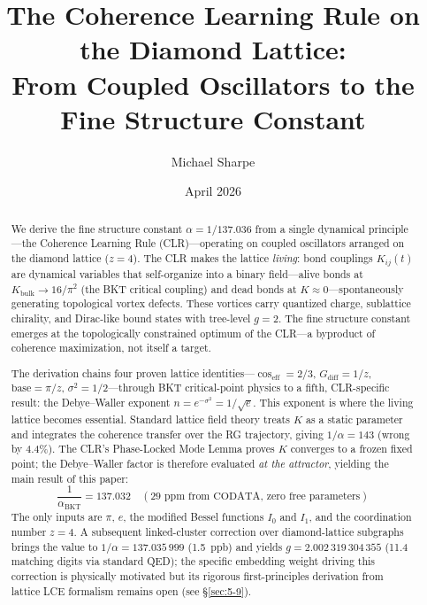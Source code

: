 \documentclass[aps,prd,onecolumn,superscriptaddress,floatfix,12pt]{revtex4-2}
\newcommand{\Kbulk}{K_{\text{bulk}}}
\newcommand{\coseff}{\cos_{\text{eff}}}
\newcommand{\Gdiff}{G_{\text{diff}}}
\begin{document}
\title{The Coherence Learning Rule on the Diamond Lattice:\\
From Coupled Oscillators to the Fine Structure Constant}

\author{Michael Sharpe}

\date{April 2026}

\begin{abstract}
We derive the fine structure constant $\alpha = 1/137.036$ from a single dynamical principle---the Coherence Learning Rule (CLR)---operating on coupled oscillators arranged on the diamond lattice ($z = 4$). The CLR makes the lattice \emph{living}: bond couplings $K_{ij}(t)$ are dynamical variables that self-organize into a binary field---alive bonds at $\Kbulk \to 16/\pi^2$ (the BKT critical coupling) and dead bonds at $K \approx 0$---spontaneously generating topological vortex defects. These vortices carry quantized charge, sublattice chirality, and Dirac-like bound states with tree-level $g = 2$. The fine structure constant emerges at the topologically constrained optimum of the CLR---a byproduct of coherence maximization, not itself a target.

The derivation chains four proven lattice identities---$\coseff = 2/3$, $\Gdiff = 1/z$, $\text{base} = \pi/z$, $\sigma^2 = 1/2$---through BKT critical-point physics to a fifth, CLR-specific result: the Debye--Waller exponent $n = e^{-\sigma^2} = 1/\sqrt{e}$.  This exponent is where the living lattice becomes essential.  Standard lattice field theory treats $K$ as a static parameter and integrates the coherence transfer over the RG trajectory, giving $1/\alpha = 143$ (wrong by 4.4\%).  The CLR's Phase-Locked Mode Lemma proves $K$ converges to a frozen fixed point; the Debye--Waller factor is therefore evaluated \emph{at the attractor}, yielding the main result of this paper:
\begin{equation}
\boxed{\frac{1}{\alpha_{\text{BKT}}} = 137.032 \quad (\text{29 ppm from CODATA, zero free parameters})}
\end{equation}
The only inputs are $\pi$, $e$, the modified Bessel functions $I_0$ and $I_1$, and the coordination number $z = 4$. A subsequent linked-cluster correction over diamond-lattice subgraphs brings the value to $1/\alpha = 137.035\,999$ (1.5~ppb) and yields $g = 2.002\,319\,304\,355$ (11.4 matching digits via standard QED); the specific embedding weight driving this correction is physically motivated but its rigorous first-principles derivation from lattice LCE formalism remains open (see \S\ref{sec:5-9}).
\end{abstract}
\end{document}
